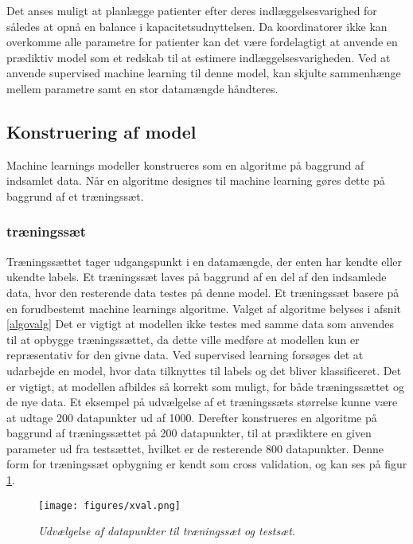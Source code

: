 Det anses muligt at planlægge patienter efter deres indlæggelsesvarighed for således at opnå en balance i kapacitetsudnyttelsen. Da koordinatorer ikke kan overkomme alle parametre for patienter kan det være fordelagtigt at anvende en prædiktiv model som et redskab til at estimere indlæggelsesvarigheden. Ved at anvende supervised machine learning til denne model, kan skjulte sammenhænge mellem parametre samt en stor datamængde håndteres\cite{DIKU2010}.

\subsection{Konstruering af model}
Machine learnings modeller konstrueres som en algoritme på baggrund af indsamlet data.\cite{Kuhn2013}  Når en algoritme designes til machine learning gøres dette på baggrund af et træningssæt. \cite{DIKU2010} 


\subsubsection{træningssæt}
Træningssættet tager udgangspunkt i en datamængde, der enten har kendte eller ukendte labels. Et træningssæt laves på baggrund af en del af den indsamlede data, hvor den resterende data testes på denne model. Et træningssæt basere på en forudbestemt machine learnings algoritme. Valget af algoritme belyses i afsnit \ref{algovalg}
Det er vigtigt at modellen ikke testes med samme data som anvendes til at opbygge træningssættet, da dette ville medføre at modellen kun er repræsentativ for den givne data.\cite{Kuhn2013} Ved supervised learning forsøges det at udarbejde en model, hvor data tilknyttes til labels og det bliver klassificeret. Det er vigtigt, at modellen afbildes så korrekt som muligt, for både træningssættet og de nye data. Et eksempel på udvælgelse af et træningssæts størrelse kunne være at udtage 200 datapunkter ud af 1000. Derefter konstrueres en algoritme på baggrund af træningssættet på 200 datapunkter, til at prædiktere en given parameter ud fra testsættet, hvilket er de resterende 800 datapunkter. Denne form for træningssæt opbygning er kendt som cross validation, og kan ses på figur \ref{fig:xval}\cite{Kuhn2013}.


\begin{figure}[H]
	\centering
	\texttt{[image: figures/xval.png]}
	\caption{\textit{Udvælgelse af datapunkter til træningssæt og testsæt.\cite{Kuhn2013}}}
	\label{fig:xval}
\end{figure}


